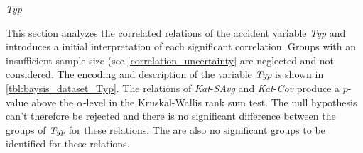 \Large
\centerline{\textit{Typ}}
\normalsize
This section analyzes the correlated relations of the accident variable \textit{Typ} and introduces a initial interpretation of each significant correlation. Groups with an insufficient sample size (see \cref{correlation_uncertainty} are neglected and not considered. The encoding and description of the variable \textit{Typ} is shown in \cref{tbl:baysis_dataset_Typ}. The relations of \textit{Kat}-\textit{SAvg} and 
\textit{Kat}-\textit{Cov} produce a $p$-value above the $\alpha$-level in the Kruskal-Wallis rank sum test. The null hypothesis can't therefore be rejected and there is no significant difference between the groups of \textit{Typ} for these relations. The are also no significant groups to be identified for these relations.

